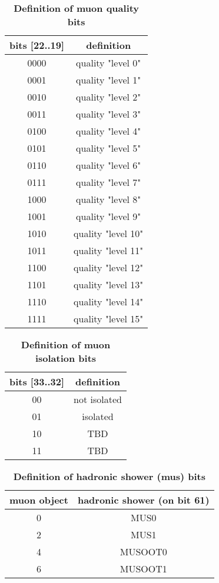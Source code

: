 \documentclass{cmspaper}
\begin{document}
\begin{table}[ht]
\caption{\bf Definition of muon quality bits}
\vspace{5mm}
\centering
\begin{tabular}{|c|c|}\hline
bits [22..19] & definition \\\hline\hline
0000 & quality "level 0" \\
0001 & quality "level 1" \\
0010 & quality "level 2" \\
0011 & quality "level 3" \\
0100 & quality "level 4" \\
0101 & quality "level 5" \\
0110 & quality "level 6" \\
0111 & quality "level 7" \\
1000 & quality "level 8" \\
1001 & quality "level 9" \\
1010 & quality "level 10" \\
1011 & quality "level 11" \\
1100 & quality "level 12" \\
1101 & quality "level 13" \\
1110 & quality "level 14" \\
1111 & quality "level 15" \\\hline
\end{tabular}
\label{table:muon_quality_bits}
\end{table}

\begin{table}[ht]
\caption{\bf Definition of muon isolation bits}
\vspace{5mm}
\centering
\begin{tabular}{|c|c|}\hline
bits [33..32] & definition \\\hline\hline
00 & not isolated \\
01 & isolated \\
10 & TBD \\
11 & TBD \\\hline
\end{tabular}
\label{table:muon_iso_bits}
\end{table}

\begin{table}[ht]
\caption{\bf Definition of hadronic shower (mus) bits}
\vspace{5mm}
\centering
\begin{tabular}{|c|c|}\hline
muon object & hadronic shower (on bit 61)\\\hline\hline
0 & MUS0 \\
2 & MUS1 \\
4 & MUSOOT0 \\
6 & MUSOOT1 \\\hline
\end{tabular}
\label{table:muon_shower_bits}
\end{table}
\end{document}
